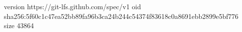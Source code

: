 version https://git-lfs.github.com/spec/v1
oid sha256:5f60c1c47ea52bb89fa96b3ca24b244c54374f83618c0a8691ebb2899e5bf776
size 43864
